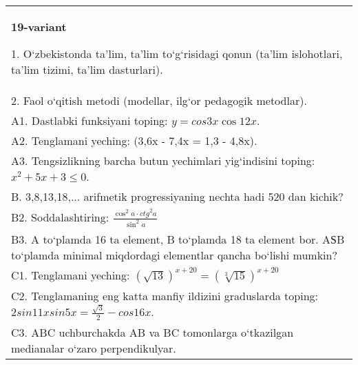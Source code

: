 \documentclass{article}
\begin{document}
\begin{tabular}{m{17cm}}
\textbf{19-variant}

1. O‘zbekistonda ta’lim, ta’lim to‘g‘risidagi qonun (ta’lim islohotlari, ta’lim tizimi, ta’lim dasturlari). \\
2. Faol o‘qitish metodi (modellar, ilg‘or pedagogik metodlar). \\
A1. Dastlabki funksiyani toping: \(y=cos{3x}\cos{12x}\). \\
A2. Tenglamani yeching: (3,6x - 7,4x = 1,3 - 4,8x). \\
A3. Tengsizlikning barcha butun yechimlari yig‘indisini toping: \(x^2 + 5x + 3 \leq 0\). \\
B. 3,8,13,18,... arifmetik progressiyaning nechta hadi 520 dan kichik? \\
B2. Soddalashtiring: \(\frac{\cos^{2}a \cdot {ctg}^{2}a}{\sin^{2}a}\) \\
B3. A to‘plamda 16 ta element, B to‘plamda 18 ta element bor. AЅB to‘plamda minimal miqdordagi elementlar qancha bo‘lishi mumkin? \\
C1. Tenglamani yeching: \((\sqrt{13}) ^{x + 20} = (\sqrt[3]{15}) ^{x + 20}\) \\
C2. Tenglamaning eng katta manfiy ildizini graduslarda toping: \(2sin11xsin5x = \frac{\sqrt{3}}{2} - cos16x\). \\
C3. ABC uchburchakda AB va BC tomonlarga o‘tkazilgan medianalar o‘zaro perpendikulyar. \\

\end{tabular}
\vspace{1cm}
\end{document}
